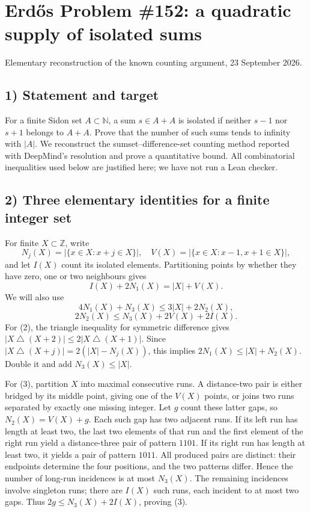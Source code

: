 \section{Erd\H{o}s Problem \#152: a quadratic supply of isolated sums}
\noindent Elementary reconstruction of the known counting argument, 23 September 2026.

\subsection*{1) Statement and target}
For a finite Sidon set $A\subset\mathbb N$, a sum $s\in A+A$ is isolated if neither $s-1$ nor $s+1$ belongs to $A+A$. Prove that the number of such sums tends to infinity with $|A|$. We reconstruct the sumset--difference-set counting method reported with DeepMind's resolution and prove a quantitative bound. All combinatorial inequalities used below are justified here; we have not run a Lean checker.

\subsection*{2) Three elementary identities for a finite integer set}
For finite $X\subset\mathbb Z$, write
\[
 N_j(X)=|\{x\in X:x+j\in X\}|,\quad
 V(X)=|\{x\in X:x-1,x+1\in X\}|,
\]
and let $I(X)$ count its isolated elements. Partitioning points by whether they have zero, one or two neighbours gives
\[
 I(X)+2N_1(X)=|X|+V(X).\tag{1}
\]
We will also use
\[
 4N_1(X)+N_3(X)\le3|X|+2N_2(X),\tag{2}
\]
\[
 2N_2(X)\le N_3(X)+2V(X)+2I(X).\tag{3}
\]
For (2), the triangle inequality for symmetric difference gives
$|X\mathbin\triangle(X+2)|\le2|X\mathbin\triangle(X+1)|$.
Since $|X\mathbin\triangle(X+j)|=2(|X|-N_j(X))$, this implies $2N_1(X)\le|X|+N_2(X)$. Double it and add $N_3(X)\le|X|$.

For (3), partition $X$ into maximal consecutive runs. A distance-two pair is either bridged by its middle point, giving one of the $V(X)$ points, or joins two runs separated by exactly one missing integer. Let $g$ count these latter gaps, so $N_2(X)=V(X)+g$. Each such gap has two adjacent runs. If its left run has length at least two, the last two elements of that run and the first element of the right run yield a distance-three pair of pattern $1101$. If its right run has length at least two, it yields a pair of pattern $1011$. All produced pairs are distinct: their endpoints determine the four positions, and the two patterns differ. Hence the number of long-run incidences is at most $N_3(X)$. The remaining incidences involve singleton runs; there are $I(X)$ such runs, each incident to at most two gaps. Thus $2g\le N_3(X)+2I(X)$, proving (3).

